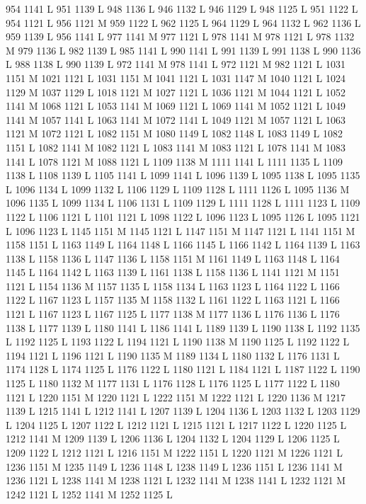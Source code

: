 {{{{{{{{{{{{{{{{{{{{{{{{954 1141 L
951 1139 L
948 1136 L
946 1132 L
946 1129 L
948 1125 L
951 1122 L
954 1121 L
956 1121 M 959 1122 L
962 1125 L
964 1129 L
964 1132 L
962 1136 L
959 1139 L
956 1141 L
977 1141 M 977 1121 L
978 1141 M 978 1121 L
978 1132 M 979 1136 L
982 1139 L
985 1141 L
990 1141 L
991 1139 L
991 1138 L
990 1136 L
988 1138 L
990 1139 L
972 1141 M 978 1141 L
972 1121 M 982 1121 L
1031 1151 M 1021 1121 L
1031 1151 M 1041 1121 L
1031 1147 M 1040 1121 L
1024 1129 M 1037 1129 L
1018 1121 M 1027 1121 L
1036 1121 M 1044 1121 L
1052 1141 M 1068 1121 L
1053 1141 M 1069 1121 L
1069 1141 M 1052 1121 L
1049 1141 M 1057 1141 L
1063 1141 M 1072 1141 L
1049 1121 M 1057 1121 L
1063 1121 M 1072 1121 L
1082 1151 M 1080 1149 L
1082 1148 L
1083 1149 L
1082 1151 L
1082 1141 M 1082 1121 L
1083 1141 M 1083 1121 L
1078 1141 M 1083 1141 L
1078 1121 M 1088 1121 L
1109 1138 M 1111 1141 L
1111 1135 L
1109 1138 L
1108 1139 L
1105 1141 L
1099 1141 L
1096 1139 L
1095 1138 L
1095 1135 L
1096 1134 L
1099 1132 L
1106 1129 L
1109 1128 L
1111 1126 L
1095 1136 M 1096 1135 L
1099 1134 L
1106 1131 L
1109 1129 L
1111 1128 L
1111 1123 L
1109 1122 L
1106 1121 L
1101 1121 L
1098 1122 L
1096 1123 L
1095 1126 L
1095 1121 L
1096 1123 L
1145 1151 M 1145 1121 L
1147 1151 M 1147 1121 L
1141 1151 M 1158 1151 L
1163 1149 L
1164 1148 L
1166 1145 L
1166 1142 L
1164 1139 L
1163 1138 L
1158 1136 L
1147 1136 L
1158 1151 M 1161 1149 L
1163 1148 L
1164 1145 L
1164 1142 L
1163 1139 L
1161 1138 L
1158 1136 L
1141 1121 M 1151 1121 L
1154 1136 M 1157 1135 L
1158 1134 L
1163 1123 L
1164 1122 L
1166 1122 L
1167 1123 L
1157 1135 M 1158 1132 L
1161 1122 L
1163 1121 L
1166 1121 L
1167 1123 L
1167 1125 L
1177 1138 M 1177 1136 L
1176 1136 L
1176 1138 L
1177 1139 L
1180 1141 L
1186 1141 L
1189 1139 L
1190 1138 L
1192 1135 L
1192 1125 L
1193 1122 L
1194 1121 L
1190 1138 M 1190 1125 L
1192 1122 L
1194 1121 L
1196 1121 L
1190 1135 M 1189 1134 L
1180 1132 L
1176 1131 L
1174 1128 L
1174 1125 L
1176 1122 L
1180 1121 L
1184 1121 L
1187 1122 L
1190 1125 L
1180 1132 M 1177 1131 L
1176 1128 L
1176 1125 L
1177 1122 L
1180 1121 L
1220 1151 M 1220 1121 L
1222 1151 M 1222 1121 L
1220 1136 M 1217 1139 L
1215 1141 L
1212 1141 L
1207 1139 L
1204 1136 L
1203 1132 L
1203 1129 L
1204 1125 L
1207 1122 L
1212 1121 L
1215 1121 L
1217 1122 L
1220 1125 L
1212 1141 M 1209 1139 L
1206 1136 L
1204 1132 L
1204 1129 L
1206 1125 L
1209 1122 L
1212 1121 L
1216 1151 M 1222 1151 L
1220 1121 M 1226 1121 L
1236 1151 M 1235 1149 L
1236 1148 L
1238 1149 L
1236 1151 L
1236 1141 M 1236 1121 L
1238 1141 M 1238 1121 L
1232 1141 M 1238 1141 L
1232 1121 M 1242 1121 L
1252 1141 M 1252 1125 L
}}}}}}}}}}}}}}}}}}}}}}}}
